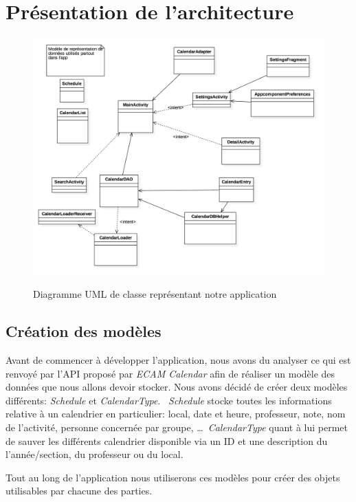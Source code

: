 \documentclass{article}
\begin{document}
	\section{Présentation de l'architecture}
        \begin{figure}
            \centering
            \includegraphics[scale=0.2]{img/uml.png}
            \label{fig:uml}
            \caption{Diagramme UML de classe représentant notre application}
        \end{figure}

	\subsection{Création des modèles}
		Avant de commencer à développer l'application, nous avons du analyser ce qui est renvoyé par
        l'API proposé par \textit{ECAM Calendar}
		afin de réaliser un modèle des données que nous allons devoir stocker. Nous avons décidé de créer deux modèles différents:
        \textit{Schedule} et \textit{CalendarType}. \
        \textit{Schedule} stocke toutes les informations relative à un calendrier en particulier: local, date et heure,
		professeur, note, nom de l'activité, personne concernée par groupe, \ldots \
        \textit{CalendarType} quant à lui permet de sauver les différents calendrier disponible via un ID et une description du l'année/section,
		du professeur ou du local. \

		Tout au long de l'application nous utiliserons ces modèles pour créer des objets utilisables par chacune des parties.
\end{document}
